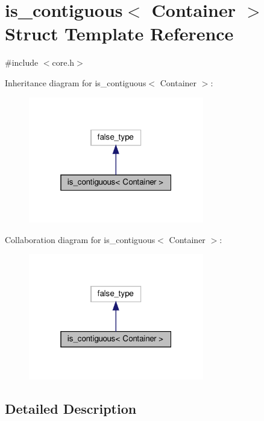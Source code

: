 \hypertarget{structis__contiguous}{}\section{is\+\_\+contiguous$<$ Container $>$ Struct Template Reference}
\label{structis__contiguous}


{\ttfamily \#include $<$core.\+h$>$}



Inheritance diagram for is\+\_\+contiguous$<$ Container $>$\+:
\nopagebreak
\begin{figure}[H]
\begin{center}
\leavevmode
\includegraphics[width=217pt]{structis__contiguous__inherit__graph}
\end{center}
\end{figure}


Collaboration diagram for is\+\_\+contiguous$<$ Container $>$\+:
\nopagebreak
\begin{figure}[H]
\begin{center}
\leavevmode
\includegraphics[width=217pt]{structis__contiguous__coll__graph}
\end{center}
\end{figure}


\subsection{Detailed Description}
